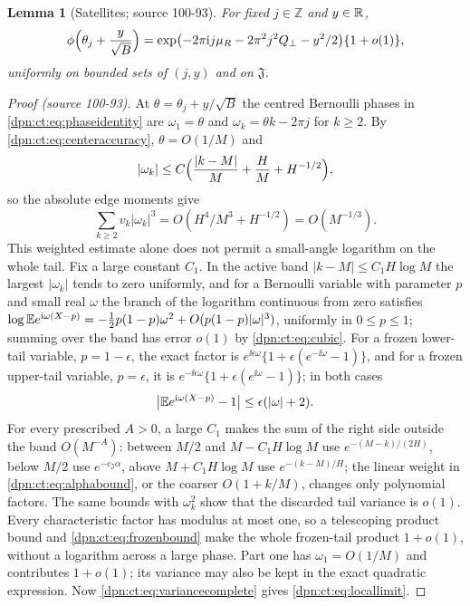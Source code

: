 \documentclass[11pt]{article}
\numberwithin{equation}{section}
\newtheorem{lemma}[theorem]{Lemma}
\theoremstyle{definition}\newtheorem{definition}[theorem]{Definition}
\theoremstyle{remark}\newtheorem{remark}[theorem]{Remark}
\newcommand{\src}[1]{\textup{(source #1)}}
\begin{document}
\begin{lemma}[Satellites; source 100-93]\label{dpn:ct:lem:local}
For fixed $j\in\mathbb Z$ and $y\in\mathbb R$,
\begin{equation}\label{dpn:ct:eq:locallimit}
 \phi\Bigl(\theta_j+\frac y{\sqrt B}\Bigr)
 =\exp\bigl(-2\pi\mathrm i j\mu_R-2\pi^2j^2Q_\perp-y^2/2\bigr)\{1+o(1)\},
\end{equation}
uniformly on bounded sets of $(j,y)$ and on $\mathfrak J$.
\end{lemma}
\begin{proof}[Proof \src{100-93}]
At $\theta=\theta_j+y/\sqrt B$ the centred Bernoulli phases in
\eqref{dpn:ct:eq:phaseidentity} are $\omega_1=\theta$ and
$\omega_k=\theta k-2\pi j$ for $k\ge2$.  By \eqref{dpn:ct:eq:centeraccuracy},
$\theta=O(1/M)$ and
\begin{equation}\label{dpn:ct:eq:alphabound}
 |\omega_k|\le C\Bigl(\frac{|k-M|}M+\frac HM+H^{-1/2}\Bigr),
\end{equation}
so the absolute edge moments give
\begin{equation}\label{dpn:ct:eq:cubic}
 \sum_{k\ge2}v_k|\omega_k|^3=O(H^4/M^3+H^{-1/2})=O(M^{-1/3}).
\end{equation}
This weighted estimate alone does not permit a small-angle logarithm on the
whole tail.  Fix a large constant $C_1$.  In the active band
$|k-M|\le C_1H\log M$ the largest $|\omega_k|$ tends to zero uniformly, and for
a Bernoulli variable with parameter $p$ and small real $\omega$ the branch of
the logarithm continuous from zero satisfies
$\log\mathbb E e^{\mathrm i\omega(X-p)}=-\frac12p(1-p)\omega^2+O(p(1-p)|\omega|^3)$, uniformly in
$0\le p\le1$; summing over the band has error $o(1)$ by \eqref{dpn:ct:eq:cubic}.
For a frozen lower-tail variable, $p=1-\epsilon$, the exact factor is
$e^{\ii\epsilon\omega}\{1+\epsilon(e^{-\ii\omega}-1)\}$, and for a frozen upper-tail
variable, $p=\epsilon$, it is $e^{-\ii\epsilon\omega}\{1+\epsilon(e^{\ii\omega}-1)\}$;
in both cases
\begin{equation}\label{dpn:ct:eq:frozenbound}
 \bigl|\mathbb E e^{\mathrm i\omega(X-p)}-1\bigr|\le\epsilon(|\omega|+2).
\end{equation}
For every prescribed $A>0$, a large $C_1$ makes the sum of the right side
outside the band $O(M^{-A})$: between $M/2$ and $M-C_1H\log M$ use
$e^{-(M-k)/(2H)}$, below $M/2$ use $e^{-c_{\mathfrak J}\alpha}$, above
$M+C_1H\log M$ use $e^{-(k-M)/H}$; the linear weight in
\eqref{dpn:ct:eq:alphabound}, or the coarser $O(1+k/M)$, changes only
polynomial factors.  The same bounds with $\omega_k^2$ show that the discarded
tail variance is $o(1)$.  Every characteristic factor has modulus at most
one, so a telescoping product bound and \eqref{dpn:ct:eq:frozenbound} make
the whole frozen-tail product $1+o(1)$, without a logarithm across a large
phase.  Part one has $\omega_1=O(1/M)$ and contributes $1+o(1)$; its variance
may also be kept in the exact quadratic expression.  Now
\eqref{dpn:ct:eq:variancecomplete} gives \eqref{dpn:ct:eq:locallimit}.
\end{proof}
\end{document}
